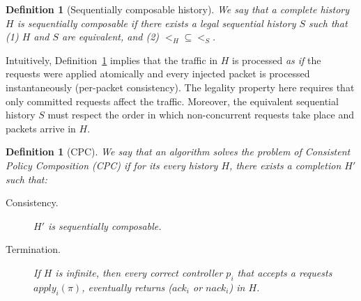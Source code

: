 \documentclass[11pt,pdftex,letter]{article}
\newcommand{\ssnote}[1]{\textcolor{heraldBlue}{\small \bf [SS: #1]}}
\newcommand{\ssnote}[1]{}
\newcommand{\ack}{\textit{ack}}
\newcommand{\nack}{\textit{nack}}
\newtheorem{definition}[theorem]{Definition}
\begin{document}
\begin{definition}[Sequentially composable history]\label{def:history}
We say that a complete history $H$ is \emph{sequentially composable}
if there exists a legal sequential history $S$ such that (1) $H$ and
$S$ are equivalent, and (2)  $<_H\subseteq <_S$.
\end{definition}
%
Intuitively, Definition~\ref{def:history} implies that the traffic in
$H$ is processed \emph{as if} the requests were applied atomically and
every injected packet is processed instantaneously (per-packet consistency).
The legality property here requires that only committed requests affect the traffic.
Moreover, the equivalent sequential history $S$ must respect the
order in which non-concurrent requests take place and packets arrive in $H$.

\begin{definition}[CPC]\label{def:CPC}
We say that an algorithm solves the problem of Consistent Policy
Composition (CPC) if for its every history $H$, there exists a
completion $H'$ such that:
\begin{description}

\item[Consistency.] $H'$ is sequentially composable.


\item[Termination.]  If $H$ is infinite, then every correct controller $p_i$
  that accepts a requests $\textit{apply}_i(\pi)$, eventually returns ($\ack_i$ or
  $\nack_i$) in $H$.
\end{description}
\end{definition}
%
%
%
\end{document}
